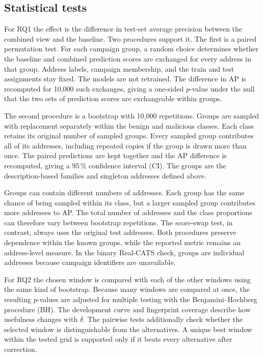 \subsection{Statistical tests}

For RQ1 the effect is the difference in test-set average precision between the
combined view and the baseline. Two procedures support it. The first is a
paired permutation test. For each campaign group, a random choice determines
whether the baseline and combined prediction scores are exchanged for every
address in that group. Address labels, campaign membership, and the train and
test assignments stay fixed. The models are not retrained. The difference in
AP is recomputed for 10{,}000 such exchanges, giving a one-sided $p$-value under
the null that the two sets of prediction scores are exchangeable within groups.

The second procedure is a bootstrap with 10{,}000 repetitions. Groups are
sampled with replacement separately within the benign and malicious classes.
Each class retains its original number of sampled groups. Every sampled group
contributes all of its addresses, including repeated copies if the group is
drawn more than once. The paired predictions are kept together and the AP
difference is recomputed, giving a 95\,\% confidence interval (CI).
The groups are the description-based families and singleton addresses defined
above.

Groups can contain different numbers of addresses. Each group has the same
chance of being sampled within its class, but a larger sampled group contributes
more addresses to AP. The total number of addresses and the class proportions
can therefore vary between bootstrap repetitions. The score-swap test, in
contrast, always uses the original test addresses. Both procedures preserve
dependence within the known groups, while the reported metric remains an
address-level measure. In the binary Real-CATS check, groups are individual
addresses because campaign identifiers are unavailable.

For RQ2 the chosen window is compared with each of the other windows using the
same kind of bootstrap. Because many windows are compared at once, the resulting
$p$-values are adjusted for multiple testing with the Benjamini--Hochberg
procedure (BH). The development curve and fingerprint coverage describe how
usefulness changes with $\delta$. The pairwise tests additionally check whether
the selected window is distinguishable from the alternatives. A unique best
window within the tested grid is supported only if it beats every alternative
after correction.

